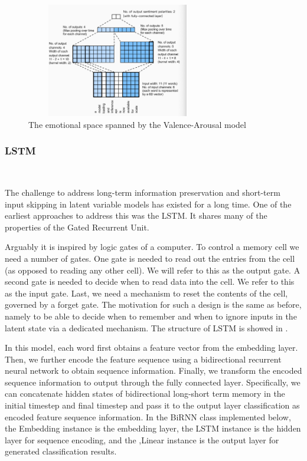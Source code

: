 \begin{figure}[htbp]
	\centering
	\includegraphics[height=5cm,width=8cm]{figures/textCNN_en.eps}
	\caption{The emotional space spanned by the Valence-Arousal model}\label{fig:cnn}
\end{figure}

\subsubsection{LSTM}
\

The challenge to 
address long-term information preservation 
and short-term input skipping 
in latent variable models 
has existed for a long time. 
One of the earliest approaches to 
address this was the LSTM. 
It shares many of 
the properties of the Gated Recurrent Unit. 

Arguably it is inspired by 
logic gates of a computer. 
To control a memory cell 
we need a number of gates. 
One gate is needed to 
read out the entries from the cell 
(as opposed to reading any other cell). 
We will refer to this as the output gate. 
A second gate is needed to 
decide when to read data into the cell. 
We refer to this as the input gate. 
Last, 
we need a mechanism to 
reset the contents of the cell, 
governed by a forget gate. 
The motivation for 
such a design is the same as before, 
namely to be able to decide 
when to remember and 
when to ignore inputs 
in the latent state 
via a dedicated mechanism. 
The structure of LSTM is showed in .

In this model, 
each word first obtains a feature vector 
from the embedding layer. 
Then, 
we further encode the feature sequence using 
a bidirectional recurrent neural network to 
obtain sequence information. 
Finally, 
we transform 
the encoded sequence information to 
output through the fully connected layer. 
Specifically, 
we can concatenate hidden states of 
bidirectional long-short term memory 
in the initial timestep and final timestep 
and pass it to the output layer classification 
as encoded feature sequence information. 
In the BiRNN class implemented below, 
the Embedding instance is 
the embedding layer, 
the LSTM instance is 
the hidden layer for sequence encoding, 
and the ,Linear instance is 
the output layer for generated classification results.

